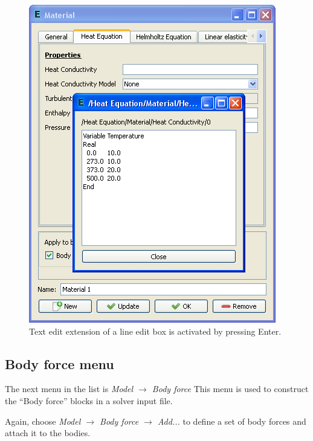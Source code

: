 \documentclass[a4paper,12pt]{article}
\newcommand{\menu}[2]{{\it \vskip2mm #1 $\rightarrow$ #2 \vskip2mm}}
\newcommand{\dynmenu}[3]{{\it \vskip2mm #1 $\rightarrow$ #2 $\rightarrow$ #3 \vskip2mm}}
\begin{document}
\begin{figure}[ht]
\begin{center}
 \includegraphics[scale=0.5]{images/textedit.png}
\caption{Text edit extension of a line edit box is activated by pressing Enter.}
\end{center}
\end{figure}

\subsection{Body force menu}

The next menu in the list is
\menu{Model}{Body force}
\noindent This menu is used to construct the ``Body force'' blocks in a
solver input file.

Again, choose
\dynmenu{Model}{Body force}{Add...}
\noindent to define a set of body forces and attach it to the bodies.
\end{document}
